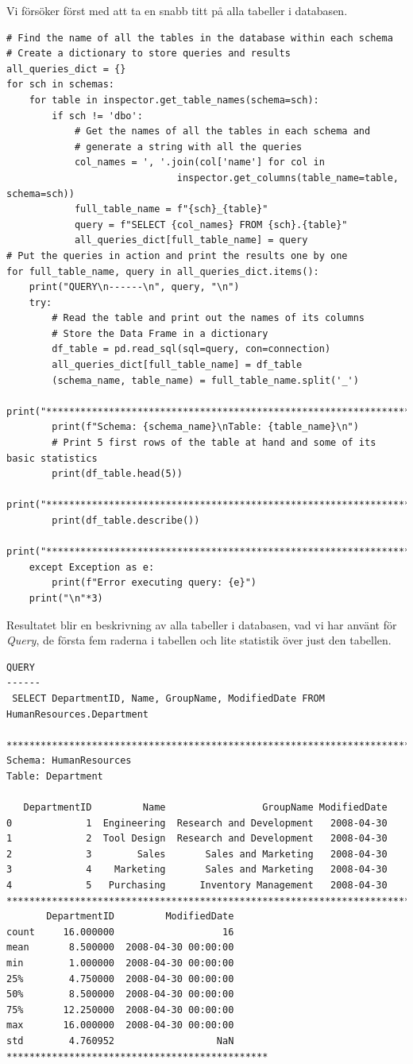 \documentclass[]{article}
\begin{document}
Vi försöker först med att ta en snabb titt på alla tabeller i databasen.
\begin{lstlisting}
# Find the name of all the tables in the database within each schema
# Create a dictionary to store queries and results
all_queries_dict = {}
for sch in schemas:
    for table in inspector.get_table_names(schema=sch):
        if sch != 'dbo':
            # Get the names of all the tables in each schema and
            # generate a string with all the queries
            col_names = ', '.join(col['name'] for col in 
            			      inspector.get_columns(table_name=table, schema=sch))
            full_table_name = f"{sch}_{table}"
            query = f"SELECT {col_names} FROM {sch}.{table}"
            all_queries_dict[full_table_name] = query
# Put the queries in action and print the results one by one
for full_table_name, query in all_queries_dict.items():
    print("QUERY\n------\n", query, "\n")
    try:
        # Read the table and print out the names of its columns
        # Store the Data Frame in a dictionary
        df_table = pd.read_sql(sql=query, con=connection)
        all_queries_dict[full_table_name] = df_table
        (schema_name, table_name) = full_table_name.split('_')
        print("******************************************************************")
        print(f"Schema: {schema_name}\nTable: {table_name}\n")
        # Print 5 first rows of the table at hand and some of its basic statistics
        print(df_table.head(5))
        print("******************************************************************")
        print(df_table.describe())
        print("******************************************************************")
    except Exception as e:
        print(f"Error executing query: {e}")
    print("\n"*3)
\end{lstlisting}
Resultatet blir en beskrivning av alla tabeller i databasen, vad vi har använt för \emph{Query}, de första fem raderna i tabellen och lite statistik över just den tabellen.
\begin{lstlisting}
QUERY
------
 SELECT DepartmentID, Name, GroupName, ModifiedDate FROM HumanResources.Department 

*************************************************************************
Schema: HumanResources
Table: Department

   DepartmentID         Name                 GroupName ModifiedDate
0             1  Engineering  Research and Development   2008-04-30
1             2  Tool Design  Research and Development   2008-04-30
2             3        Sales       Sales and Marketing   2008-04-30
3             4    Marketing       Sales and Marketing   2008-04-30
4             5   Purchasing      Inventory Management   2008-04-30
*************************************************************************
       DepartmentID         ModifiedDate
count     16.000000                   16
mean       8.500000  2008-04-30 00:00:00
min        1.000000  2008-04-30 00:00:00
25%        4.750000  2008-04-30 00:00:00
50%        8.500000  2008-04-30 00:00:00
75%       12.250000  2008-04-30 00:00:00
max       16.000000  2008-04-30 00:00:00
std        4.760952                  NaN
**********************************************
\end{lstlisting}
\end{document}
